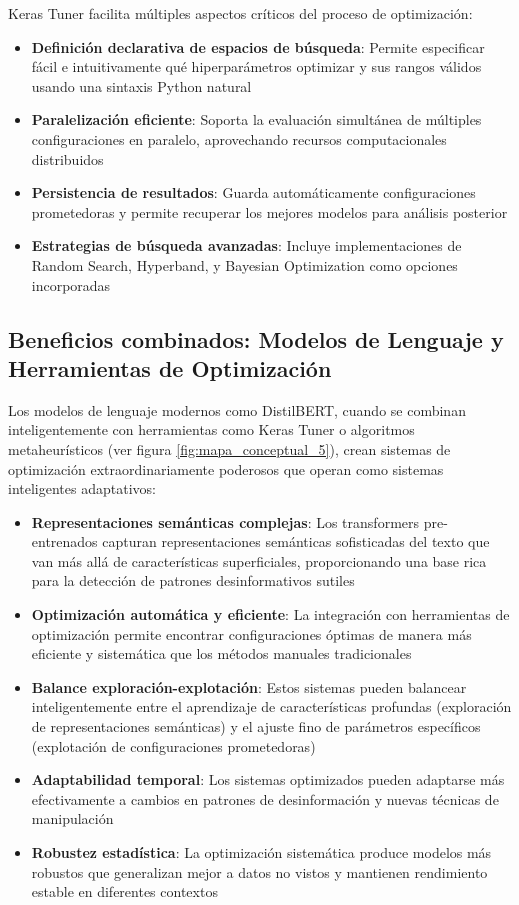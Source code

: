 Keras Tuner facilita múltiples aspectos críticos del proceso de optimización:

\begin{itemize}
    \item \textbf{Definición declarativa de espacios de búsqueda}: Permite especificar fácil e intuitivamente qué hiperparámetros optimizar y sus rangos válidos usando una sintaxis Python natural
    \item \textbf{Paralelización eficiente}: Soporta la evaluación simultánea de múltiples configuraciones en paralelo, aprovechando recursos computacionales distribuidos
    \item \textbf{Persistencia de resultados}: Guarda automáticamente configuraciones prometedoras y permite recuperar los mejores modelos para análisis posterior
    \item \textbf{Estrategias de búsqueda avanzadas}: Incluye implementaciones de Random Search, Hyperband, y Bayesian Optimization como opciones incorporadas
\end{itemize}

\subsection{Beneficios combinados: Modelos de Lenguaje y Herramientas de Optimización}

Los modelos de lenguaje modernos como DistilBERT, cuando se combinan inteligentemente con herramientas como Keras Tuner o algoritmos metaheurísticos (ver figura \ref{fig:mapa_conceptual_5}), crean sistemas de optimización extraordinariamente poderosos que operan como sistemas inteligentes adaptativos:

\begin{itemize}
    \item \textbf{Representaciones semánticas complejas}: Los transformers pre-entrenados capturan representaciones semánticas sofisticadas del texto que van más allá de características superficiales, proporcionando una base rica para la detección de patrones desinformativos sutiles
    \item \textbf{Optimización automática y eficiente}: La integración con herramientas de optimización permite encontrar configuraciones óptimas de manera más eficiente y sistemática que los métodos manuales tradicionales
    \item \textbf{Balance exploración-explotación}: Estos sistemas pueden balancear inteligentemente entre el aprendizaje de características profundas (exploración de representaciones semánticas) y el ajuste fino de parámetros específicos (explotación de configuraciones prometedoras)
    \item \textbf{Adaptabilidad temporal}: Los sistemas optimizados pueden adaptarse más efectivamente a cambios en patrones de desinformación y nuevas técnicas de manipulación
    \item \textbf{Robustez estadística}: La optimización sistemática produce modelos más robustos que generalizan mejor a datos no vistos y mantienen rendimiento estable en diferentes contextos
\end{itemize}


